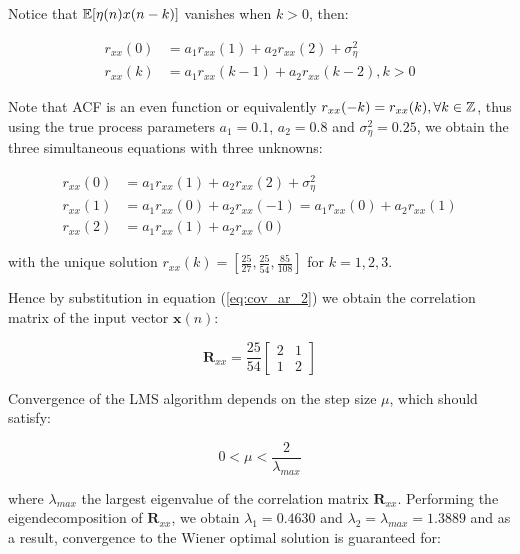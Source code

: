 \begin{enumerate}[label=\alph*), leftmargin=*]
Notice that ${\mathbb{E}} [\eta(n) x(n-k)]$ vanishes when $k > 0$, then:

\begin{align}
    r_{xx}(0)   &= a_{1} r_{xx}(1) + a_{2} r_{xx}(2) + \sigma_{\eta}^{2} \\
    r_{xx}(k)   &= a_{1} r_{xx}(k-1) + a_{2} r_{xx}(k-2), k > 0
\label{eq:acf_ar_2}
\end{align}

Note that ACF is an even function or equivalently $r_{xx}(-k) = r_{xx}(k), \forall k \in {\mathbb{Z}}$, thus using the true process parameters $a_{1} = 0.1$, $a_{2} = 0.8$
and $\sigma_{\eta}^{2} = 0.25$, we obtain the three simultaneous equations with three unknowns:

\begin{align}
    r_{xx}(0)   &= a_{1} r_{xx}(1) + a_{2} r_{xx}(2) + \sigma_{\eta}^{2} \\
    r_{xx}(1)   &= a_{1} r_{xx}(0) + a_{2} r_{xx}(-1) = a_{1} r_{xx}(0) + a_{2} r_{xx}(1) \\
    r_{xx}(2)   &= a_{1} r_{xx}(1) + a_{2} r_{xx}(0)
\end{align}

with the unique solution $r_{xx}(k) = [\frac{25}{27}, \frac{25}{54}, \frac{85}{108}]$ for $k=1, 2, 3$.

Hence by substitution in equation (\ref{eq:cov_ar_2}) we obtain the  correlation matrix of the input vector $\mathbf{x}(n)$:

\begin{equation}
    \mathbf{R}_{xx} = 
    \frac{25}{54}
    \begin{bmatrix}
        2 & 1 \\
        1 & 2
    \end{bmatrix}
\label{eq:cov_ar_2_result}
\end{equation}

Convergence of the LMS algorithm depends on the step size $\mu$, which should satisfy:

\begin{equation}
    0 < \mu < \frac{2}{\lambda_{max}}
\label{cond:mu_max}
\end{equation}

where $\lambda_{max}$ the largest eigenvalue of the correlation matrix $\mathbf{R}_{xx}$. Performing the eigendecomposition of $\mathbf{R}_{xx}$, we obtain
$\lambda_{1} = 0.4630$ and $\lambda_{2} = \lambda_{max} = 1.3889$ and as a result, convergence to the Wiener optimal solution is guaranteed for:


\end{enumerate}
